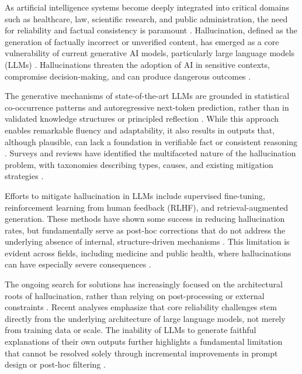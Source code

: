\documentclass[11pt,a4paper]{article}
\begin{document}
As artificial intelligence systems become deeply integrated into critical domains such as healthcare, law, scientific research, and public administration, the need for reliability and factual consistency is paramount \cite{yang2024trustworthy,shneiderman2022safety}. Hallucination, defined as the generation of factually incorrect or unverified content, has emerged as a core vulnerability of current generative AI models, particularly large language models (LLMs) \cite{ji2023hallucination}. Hallucinations threaten the adoption of AI in sensitive contexts, compromise decision-making, and can produce dangerous outcomes \cite{gunning2019xai,ji2023hallucination}.

The generative mechanisms of state-of-the-art LLMs are grounded in statistical co-occurrence patterns and autoregressive next-token prediction, rather than in validated knowledge structures or principled reflection \cite{brown2020language,ji2023hallucination,lewis2020retrieval}. While this approach enables remarkable fluency and adaptability, it also results in outputs that, although plausible, can lack a foundation in verifiable fact or consistent reasoning \cite{ji2023hallucination,ouyang2022training}. Surveys and reviews have identified the multifaceted nature of the hallucination problem, with taxonomies describing types, causes, and existing mitigation strategies \cite{ji2023hallucination,gao2023survey}.

Efforts to mitigate hallucination in LLMs include supervised fine-tuning, reinforcement learning from human feedback (RLHF), and retrieval-augmented generation. These methods have shown some success in reducing hallucination rates, but fundamentally serve as post-hoc corrections that do not address the underlying absence of internal, structure-driven mechanisms \cite{ji2023hallucination,bai2022constitutional,lewis2020retrieval}. This limitation is evident across fields, including medicine and public health, where hallucinations can have especially severe consequences \cite{yang2024trustworthy}.

The ongoing search for solutions has increasingly focused on the architectural roots of hallucination, rather than relying on post-processing or external constraints \cite{abate2022formal,hitzler2013linked,chen2021knowledge,amodei2016concrete}. Recent analyses emphasize that core reliability challenges stem directly from the underlying architecture of large language models, not merely from training data or scale. The inability of LLMs to generate faithful explanations of their own outputs further highlights a fundamental limitation that cannot be resolved solely through incremental improvements in prompt design or post-hoc filtering \cite{dziri2023reliability}.
\end{document}
